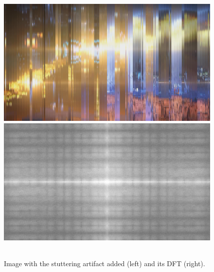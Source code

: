 \begin{figure}[H]
\centering
\includegraphics[scale=0.11]{images/0_stuttering.png}
\includegraphics[scale=0.11]{images/stuttering.png}\\\hspace{\fill}\\[-2ex]
\caption[Fourier transform on stuttering artifact]{Image with the stuttering artifact added (left) and its DFT (right).}
\label{fig:fourier4}
\end{figure}
